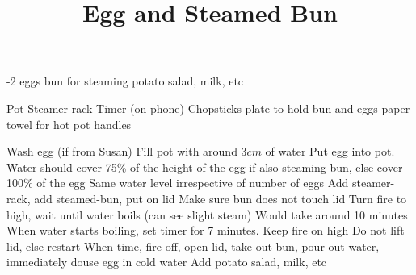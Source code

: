 \documentclass[10pt, twocolumn]{recipe}
\title{Egg and Steamed Bun}
\begin{document}
\maketitle
\begin{ingredients}
  -2 eggs
   bun for steaming
  \Item \Optional potato salad, milk, etc
\end{ingredients}

\begin{equipment}
  \Item Pot
  \Item Steamer-rack
  \Item Timer (on phone)
  \Item Chopsticks
   plate to hold bun and eggs
  \Item paper towel for hot pot handles
  \newpage
\end{equipment}

\begin{procedure}
\Step Wash egg (if from Susan)
\Step Fill pot with around $3cm$ of water
\Step Put egg into pot. Water should cover 75\% of the height of the egg if also steaming bun, else cover 100\% of the egg
\Note Same water level irrespective of number of eggs
\Step Add steamer-rack, add steamed-bun, put on lid
\Note Make sure bun does not touch lid
\Step Turn fire to high, wait until water boils (can see slight steam)
\Note Would take around 10 minutes
\Step When water starts boiling, set timer for 7 minutes. Keep fire on high
\Note Do not lift lid, else restart
\Step When time, fire off, open lid, take out bun, pour out water, immediately douse egg in cold water
\Step \Optional Add potato salad, milk, etc

\end{procedure}
\end{document}
